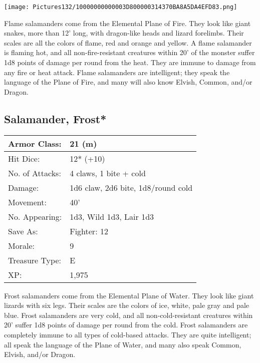 \documentclass[a4paper,twoside,openany,10pt]{book}
\begin{document}
\begin{multicols}{2}
\begin{center} \texttt{[image: Pictures132/10000000000003D800000314370BA8A5DA4EFD83.png]} \end{center}

Flame salamanders come from the Elemental Plane of Fire. They look like giant snakes, more than 12' long, with dragon-like heads and lizard forelimbs. Their scales are all the colors of flame, red and orange and yellow. A flame salamander is flaming hot, and all non-fire-resistant creatures within 20' of the monster suffer 1d8 points of damage per round from the heat. They are immune to damage from any fire or heat attack. Flame salamanders are intelligent; they speak the language of the Plane of Fire, and many will also know Elvish, Common, and/or Dragon.


\subsection*{Salamander, Frost*}\label{salamander-frost}

\begin{tabularx}{0.50\textwidth}{@{}lX@{}}
Armor Class: & 21 (m) \\\hline
Hit Dice: & 12* (+10) \\\hline
No. of Attacks: & 4 claws, 1 bite + cold \\\hline
Damage: & 1d6 claw, 2d6 bite, 1d8/round cold \\\hline
Movement: & 40' \\\hline
No. Appearing: & 1d3, Wild 1d3, Lair 1d3 \\\hline
Save As: & Fighter: 12 \\\hline
Morale: & 9 \\\hline
Treasure Type: & E \\\hline
XP: & 1,975 \\\hline
\end{tabularx}\medskip

Frost salamanders come from the Elemental Plane of Water. They look like giant lizards with six legs. Their scales are the colors of ice, white, pale gray and pale blue. Frost salamanders are very cold, and all non-cold-resistant creatures within 20' suffer 1d8 points of damage per round from the cold. Frost salamanders are completely immune to all types of cold-based attacks. They are quite intelligent; all speak the language of the Plane of Water, and many also speak Common, Elvish, and/or Dragon.


\end{multicols}
\end{document}
